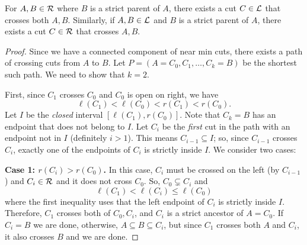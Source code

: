 \begin{lemma}\label{lem:ABcommoncross}
For $A, B\in {\cal R}$  where $B$ is a strict parent of $A$, there exists a cut $C\in {\cal L}$ that crosses both $A,B$. Similarly, if $A,B \in {\cal L}$ and $B$ is a strict parent of $A$, there exists a cut $C \in {\cal R}$ that crosses $A,B$.
\end{lemma}
\begin{proof}
Since we have a connected component of near min cuts, there exists a path of crossing cuts from $A$ to $B$. Let $P=(A=C_0, C_1,\dots, C_k=B)$ be the shortest such path. We need to show that $k=2$. 

First, since $C_1$ crosses $C_0$ and $C_0$ is open on right, we have
$$ \ell(C_1) < \ell(C_0) < r(C_1) < r(C_0).$$
Let $I$ be the {\em closed} interval $[\ell(C_1),r(C_0)]$. Note that $C_k=B$ has an endpoint that does not belong to $I$. Let $C_i$ be the {\em first} cut in the path with an endpoint not in $I$ (definitely $i>1$).
This means $C_{i-1}\subseteq I$; so, since $C_{i-1}$ crosses $C_i$,  exactly one of the endpoints of $C_i$ is strictly inside $I$. We consider two cases:

{\bf Case 1: $r(C_{i}) > r(C_0)$.} In this case, $C_i$ must be crossed on the left (by $C_{i-1}$) and $C_{i}\in {\cal R}$ and it does not cross $C_0$. So, $C_0\subsetneq C_i$ and
 $$\ell(C_1) < \ell(C_i)\leq \ell(C_0)$$
 where the first inequality uses that the left endpoint of $C_i$ is strictly inside $I$. Therefore, $C_1$ crosses both of $C_0,C_i$, and $C_i$ is a strict ancestor of $A=C_0$. If $C_i=B$ we are done, otherwise, $A\subseteq B \subseteq C_i$, but since $C_1$ crosses both  $A$ and $C_i$, it also crosses $B$ and we are done.


\end{proof}
